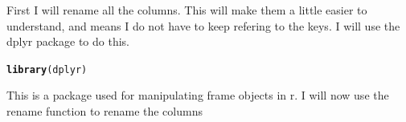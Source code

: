 \documentclass{article}\usepackage[]{graphicx}\usepackage[]{color}
\makeatletter
\newcommand{\hlstd}[1]{\textcolor[rgb]{0.345,0.345,0.345}{#1}}%
\newcommand{\hlkwd}[1]{\textcolor[rgb]{0.737,0.353,0.396}{\textbf{#1}}}%
\newenvironment{kframe}{%
 \def\at@end@of@kframe{}%
 \ifinner\ifhmode%
  \def\at@end@of@kframe{\end{minipage}}%
  \begin{minipage}{\columnwidth}%
 \fi\fi%
 \def\FrameCommand##1{\hskip\@totalleftmargin \hskip-\fboxsep
 \colorbox{shadecolor}{##1}\hskip-\fboxsep
     \hskip-\linewidth \hskip-\@totalleftmargin \hskip\columnwidth}%
 \MakeFramed {\advance\hsize-\width
   \@totalleftmargin\z@ \linewidth\hsize
   \@setminipage}}%
 {\par\unskip\endMakeFramed%
 \at@end@of@kframe}
\newenvironment{knitrout}{}{} %
\makeatother
\begin{document}
First I will rename all the columns. This will make them a little easier to understand, and means I do not have to keep refering to the keys. I will use the dplyr package to do this.
\begin{knitrout}
\color{fgcolor}\begin{kframe}
\begin{alltt}
\hlkwd{library}\hlstd{(dplyr)}
\end{alltt}


{\ttfamily\noindent\color{warningcolor}{\#\# Warning: package 'dplyr' was built under R version 3.4.2}}

{\ttfamily\noindent\itshape\color{messagecolor}{\#\# \\\#\# Attaching package: 'dplyr'}}

{\ttfamily\noindent\itshape\color{messagecolor}{\#\# The following objects are masked from 'package:stats':\\\#\# \\\#\#\ \ \ \  filter, lag}}

{\ttfamily\noindent\itshape\color{messagecolor}{\#\# The following objects are masked from 'package:base':\\\#\# \\\#\#\ \ \ \  intersect, setdiff, setequal, union}}\end{kframe}
\end{knitrout}
This is a package used for manipulating frame objects in r. I will now use the rename function to rename the columns
\end{document}
